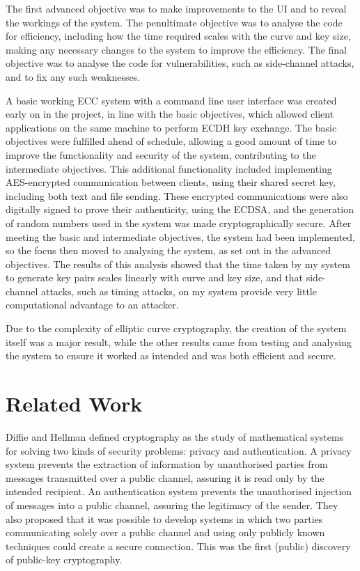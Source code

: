 \documentclass[12pt,a4paper]{article}
\begin{document}
The first advanced objective was to make improvements to the UI and to reveal the workings of the system. 
The penultimate objective was to analyse the code for efficiency, 
including how the time required scales with the curve and key size, 
making any necessary changes to the system to improve the efficiency. 
The final objective was to analyse the code for vulnerabilities, such as side-channel attacks, 
and to fix any such weaknesses. 

A basic working ECC system with a command line user interface was created early on in the project, 
in line with the basic objectives, 
which allowed client applications on the same machine to perform ECDH key exchange. 
The basic objectives were fulfilled ahead of schedule, 
allowing a good amount of time to improve the functionality and security of the system, contributing to the intermediate objectives. 
This additional functionality included implementing AES-encrypted communication between clients, 
using their shared secret key, including both text and file sending. 
These encrypted communications were also digitally signed to prove their authenticity, using the ECDSA, 
and the generation of random numbers used in the system was made cryptographically secure. 
After meeting the basic and intermediate objectives, the system had been implemented, 
so the focus then moved to analysing the system, as set out in the advanced objectives. 
The results of this analysis showed that the time taken by my system to generate key pairs scales linearly with curve and key size, and that side-channel attacks, such as timing attacks, on my system provide very little computational advantage to an attacker. 

Due to the complexity of elliptic curve cryptography, the creation of the system itself was a major result, while the other results came from testing and analysing the system to ensure it worked as intended and was both efficient and secure. 


\section{Related Work} \noindent
Diffie and Hellman \citeyear{1055638} defined cryptography as the study of 
mathematical systems for solving two kinds of security problems: privacy and authentication. 
A privacy system prevents the extraction of information by unauthorised parties from messages transmitted over a public channel, 
assuring it is read only by the intended recipient. 
An authentication system prevents the unauthorised injection of messages into a public channel, assuring the legitimacy of the sender. 
They also proposed that it was possible to develop systems in which two parties 
communicating solely over a public channel and using only publicly known techniques could create a secure connection. 
This was the first (public) discovery of public-key cryptography. 
\end{document}
